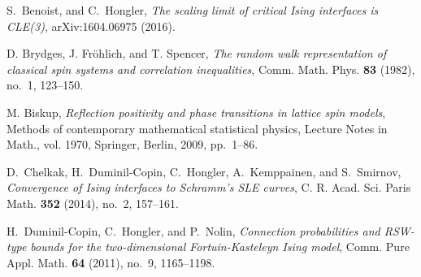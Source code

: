 \documentclass[a4paper,oneside,11pt]{article}
\begin{document}
\begin{thebibliography}{7}

S.~Benoist, and C.~Hongler, \emph{The scaling limit of critical Ising interfaces is CLE(3)}, arXiv:1604.06975 (2016).

D. Brydges, J. Fr{{\"o}}hlich, and T. Spencer, \emph{The random
  walk representation of classical spin systems and correlation inequalities},
  Comm. Math. Phys. \textbf{83} (1982), no.~1, 123--150. 

M. Biskup, \emph{Reflection positivity and phase transitions in lattice spin
  models}, Methods of contemporary mathematical statistical physics, Lecture
  Notes in Math., vol. 1970, Springer, Berlin, 2009, pp.~1--86.


D.~Chelkak, H.~Duminil-Copin, C.~Hongler, A.~Kemppainen, and S.~Smirnov,
  \emph{\mbox{Convergence} of {I}sing interfaces to {S}chramm's {SLE} curves}, C. R.
  Acad. Sci. Paris Math. \textbf{352} (2014), no.~2, 157--161.

%
%




H.~Duminil-Copin, C.~Hongler, and P.~Nolin, \emph{Connection probabilities
  and {RSW}-type bounds for the two-dimensional {Fortuin-Kasteleyn} {I}sing model}, Comm. Pure
  Appl. Math. \textbf{64} (2011), no.~9, 1165--1198. 


\end{thebibliography}
\end{document}
